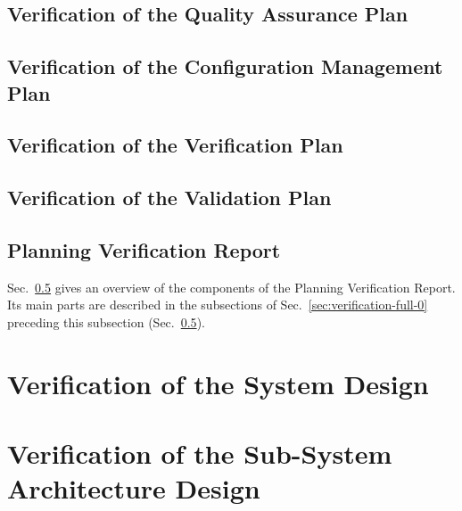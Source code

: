 \documentclass{template/openetcs_report}
\begin{document}
\subsection{Verification of the Quality Assurance Plan}
\label{sec:verification-full-01}

%

\subsection{Verification of the Configuration Management Plan}
\label{sec:verification-full-02}

%

\subsection{Verification of the Verification Plan}
\label{sec:verification-full-03}

%

\subsection{Verification of the Validation Plan}
\label{sec:verification-full-04}

%

\subsection{Planning Verification Report}
\label{sec:verification-full-05}

Sec.~\ref{sec:verification-full-05} gives an overview of the components of the Planning
Verification Report. Its main parts are described in the 
subsections of Sec.~\ref{sec:verification-full-0} preceding this
subsection (Sec.~\ref{sec:verification-full-05}).
%


\section{Verification of the System Design}
\label{sec:verification-full-1}


\section{Verification of the Sub-System Architecture Design}
\label{sec:verification-full-2}
\end{document}
